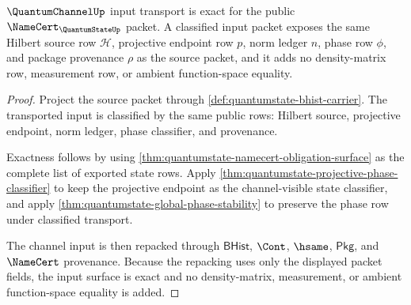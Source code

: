 \begin{theorem}
\label{thm:quantumstate-channel-input-exactness}
$\QuantumChannelUp$ input transport is exact for the public
$\NameCert_{\QuantumStateUp}$ packet. A classified input packet exposes the
same Hilbert source row $\mathcal{H}$, projective endpoint row $p$, norm ledger
$n$, phase row $\phi$, and package provenance $\rho$ as the source packet, and
it adds no density-matrix row, measurement row, or ambient function-space
equality.
\end{theorem}
\begin{proof}
Project the source packet through
\autoref{def:quantumstate-bhist-carrier}. The transported input is classified
by the same public rows: Hilbert source, projective endpoint, norm ledger,
phase classifier, and provenance.

Exactness follows by using
\autoref{thm:quantumstate-namecert-obligation-surface} as the complete list of
exported state rows. Apply
\autoref{thm:quantumstate-projective-phase-classifier} to keep the projective
endpoint as the channel-visible state classifier, and apply
\autoref{thm:quantumstate-global-phase-stability} to preserve the phase row
under classified transport.

The channel input is then repacked through $\mathsf{BHist}$, $\Cont$,
$\hsame$, $\mathsf{Pkg}$, and $\NameCert$ provenance. Because the repacking
uses only the displayed packet fields, the input surface is exact and no
density-matrix, measurement, or ambient function-space equality is added.
\end{proof}

